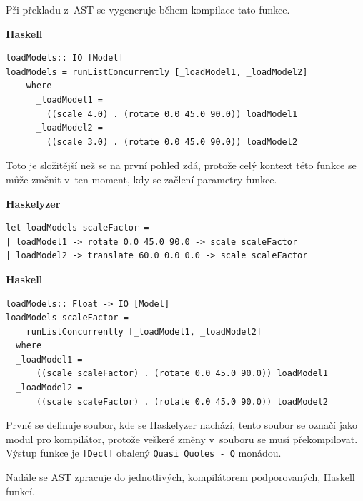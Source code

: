\documentclass[male, czech]{kithesis}
\newcommand{\haskellInline}[1]{\colorbox{gray!10}{\texttt{#1}}}
\begin{document}
\newpage

Při překladu z~AST se vygeneruje během kompilace tato funkce.

\textbf{Haskell}
\begin{verbatim}
loadModels:: IO [Model]
loadModels = runListConcurrently [_loadModel1, _loadModel2] 
    where 
      _loadModel1 = 
        ((scale 4.0) . (rotate 0.0 45.0 90.0)) loadModel1
      _loadModel2 = 
        ((scale 3.0) . (rotate 0.0 45.0 90.0)) loadModel2
\end{verbatim}

Toto je složitější než se na první pohled zdá,
protože celý kontext této funkce se může změnit v~ten moment,
kdy se začlení parametry funkce.

\textbf{Haskelyzer}
\begin{verbatim}
let loadModels scaleFactor =
| loadModel1 -> rotate 0.0 45.0 90.0 -> scale scaleFactor 
| loadModel2 -> translate 60.0 0.0 0.0 -> scale scaleFactor 
\end{verbatim}

\textbf{Haskell}
\begin{verbatim}
loadModels:: Float -> IO [Model]
loadModels scaleFactor = 
    runListConcurrently [_loadModel1, _loadModel2] 
  where 
  _loadModel1 = 
      ((scale scaleFactor) . (rotate 0.0 45.0 90.0)) loadModel1 
  _loadModel2 = 
      ((scale scaleFactor) . (rotate 0.0 45.0 90.0)) loadModel2 
\end{verbatim}

Prvně se definuje soubor, 
kde se Haskelyzer nachází,
tento soubor se označí jako modul pro kompilátor,
protože veškeré změny v~souboru se musí překompilovat. 
Výstup funkce je \haskellInline{[Decl]} obalený 
\haskellInline{Quasi Quotes - Q} monádou.

Nadále se AST zpracuje do jednotlivých, 
kompilátorem podporovaných, 
Haskell funkcí.
\end{document}
